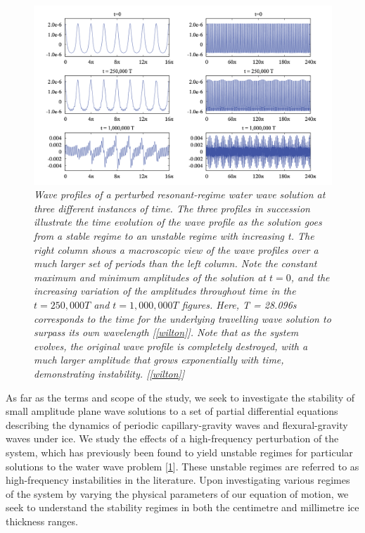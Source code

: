 \documentclass{article}
\begin{document}
\begin{figure}[hbt!]
\centering
\includegraphics[width=.8\textwidth]{Wilton.png}
\caption{\emph{Wave profiles of a perturbed resonant-regime water wave solution at three different instances of time. The three profiles in succession illustrate the time evolution of the wave profile as the solution goes from a stable regime to an unstable regime with increasing t. The right column shows a macroscopic view of the wave profiles over a much larger set of periods than the left column. Note the constant maximum and minimum amplitudes of the solution at \(t = 0\), and the increasing variation of the amplitudes throughout time in the \(t = 250,000T\) and \(t = 1,000,000T\) figures. Here, T = 28.096s corresponds to the time for the underlying travelling wave solution to surpass its own wavelength [\ref{wilton}]. Note that as the system evolves, the original wave profile is completely destroyed, with a much larger amplitude that grows exponentially with time, demonstrating instability. [\ref{wilton}]}}
\label{wilton2}
\end{figure}





 As far as the terms and scope of the study, we seek to investigate the stability of small amplitude plane wave solutions to a set of partial differential equations describing the dynamics of periodic capillary-gravity waves and flexural-gravity waves under ice. We study the effects of a high-frequency perturbation of the system, which has previously been found to yield unstable regimes for particular solutions to the water wave problem [\ref{wilton2}]. These unstable regimes are referred to as high-frequency instabilities in the literature.  Upon investigating various regimes of the system by varying the physical parameters of our equation of motion, we seek to understand the stability regimes in both the centimetre and millimetre ice thickness ranges. \\
 
\end{document}
